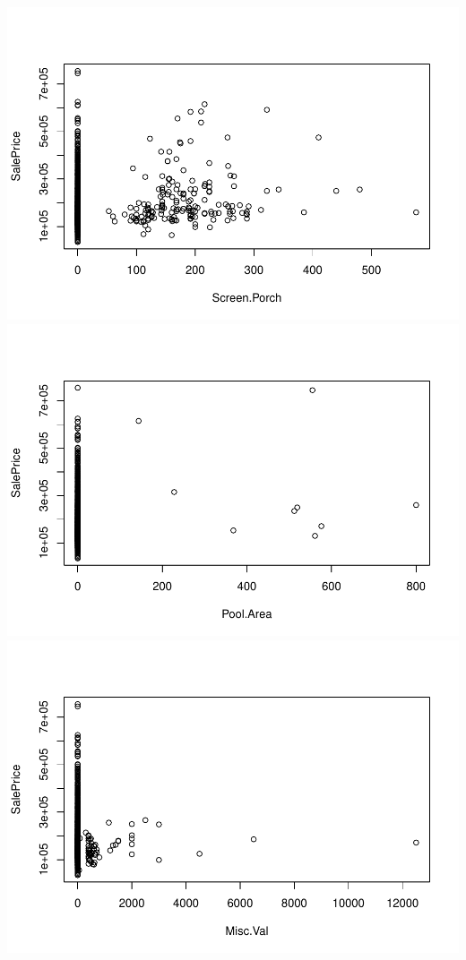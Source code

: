 \documentclass[
]{article}
\begin{document}
\includegraphics{Predicting-Housing-Price_files/figure-latex/unnamed-chunk-2-31.pdf}
\includegraphics{Predicting-Housing-Price_files/figure-latex/unnamed-chunk-2-32.pdf}
\includegraphics{Predicting-Housing-Price_files/figure-latex/unnamed-chunk-2-33.pdf}
\end{document}
